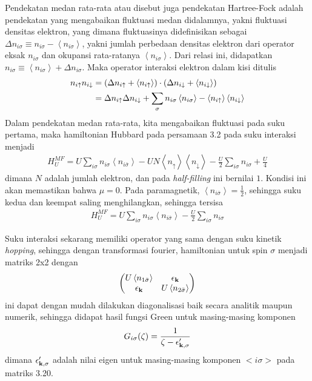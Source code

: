 Pendekatan medan rata-rata atau disebut juga pendekatan Hartree-Fock adalah pendekatan yang mengabaikan fluktuasi medan didalamnya\cite{mf}, yakni fluktuasi densitas elektron, yang dimana fluktuasinya didefinisikan sebagai $\Delta n_{i\sigma} \equiv n_{i\sigma} - \left< n_{i\sigma} \right>$, yakni jumlah perbedaan densitas elektron dari operator eksak $n_{i\sigma}$ dan okupansi rata-ratanya $\left< n_{i\sigma} \right>$. Dari relasi ini, didapatkan
$n_{i\sigma} \equiv \left< n_{i\sigma} \right> + \Delta n_{i\sigma}$. Maka operator interaksi elektron dalam kisi ditulis
\begin{align}
n_{i\uparrow}n_{i\downarrow} &= (\Delta n_{i\uparrow} + \left< n_{i\uparrow} \right>)\cdot (\Delta n_{i\downarrow} + \left< n_{i\downarrow} \right>)\notag\\
&= \Delta n_{i\uparrow} \Delta n_{i\downarrow} + \sum_\sigma n_{i\sigma} \left< n_{i\sigma} \right> - \left< n_{i\uparrow} \right> \left< n_{i\downarrow} \right>
\end{align}
Dalam pendekatan medan rata-rata, kita mengabaikan fluktuasi pada suku pertama, maka hamiltonian Hubbard pada persamaan 3.2 pada suku interaksi menjadi
\begin{align}
H_U^{MF} = U \sum_{i\sigma} n_{i\sigma} \left< n_{i\bar{\sigma}} \right> - UN \left< n_{\uparrow} \right> \left< n_{\downarrow} \right> - \frac{U}{2} \sum_{i\sigma} n_{i\sigma} + \frac{U}{4}
\end{align}
dimana $N$ adalah jumlah elektron, dan pada \textit{half-filling} ini bernilai $1$. Kondisi ini akan memastikan bahwa $\mu = 0$. Pada paramagnetik, $\left< n_{i\bar{\sigma}} \right> = \frac{1}{2}$, sehingga suku kedua dan keempat saling menghilangkan, sehingga tersisa
\begin{align}
H_U^{MF} = U \sum_{i\sigma} n_{i\sigma} \left< n_{i\bar{\sigma}} \right> - \frac{U}{2} \sum_{i\sigma} n_{i\sigma}
\end{align}

Suku interaksi sekarang memiliki operator yang sama dengan suku kinetik \textit{hopping}, sehingga dengan transformasi fourier, hamiltonian untuk spin $\sigma$ menjadi matriks 2x2 dengan 
\begin{align}
\begin{pmatrix}
U\left< n_{1\bar{\sigma}} \right> & \epsilon_{\textbf{k}}\\
\epsilon_{\textbf{k}} & U\left< n_{2\bar{\sigma}} \right>
\end{pmatrix}
\end{align}
ini dapat dengan mudah dilakukan diagonalisasi baik secara analitik maupun numerik, sehingga didapat hasil fungsi Green untuk masing-masing komponen 
\begin{align}
G_{i\sigma}(\zeta) = \frac{1}{\zeta - \epsilon'_{\textbf{k},\sigma}}
\end{align}
dimana $\epsilon'_{\textbf{k},\sigma}$ adalah nilai eigen untuk masing-masing komponen $<i\sigma>$ pada matriks 3.20.


